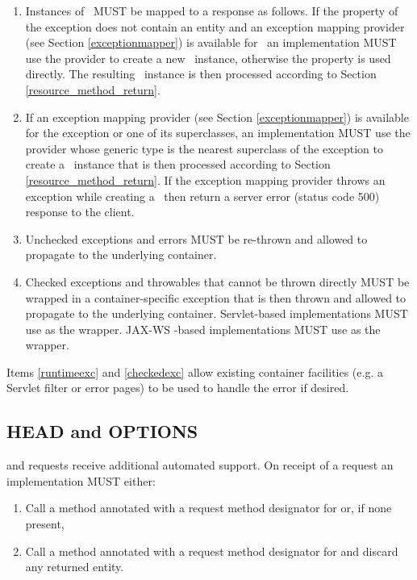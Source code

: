\begin{enumerate}
\item Instances of \WebAppExc\ MUST be mapped to a response as follows. If the  property of the exception does not contain an entity and an exception mapping provider (see Section \ref{exceptionmapper}) is available for \WebAppExc\, an implementation MUST use the provider to create a new \Response\ instance, otherwise the  property is used directly. The resulting \Response\ instance is then processed according to Section \ref{resource_method_return}.
\item If an exception mapping provider (see Section \ref{exceptionmapper}) is available for the exception or one of its superclasses, an implementation MUST use the provider whose generic type is the nearest superclass of the exception to create a \Response\ instance that is then processed according to Section \ref{resource_method_return}. If the exception mapping provider throws an exception while creating a \Response\ then return a server error (status code 500) response to the client.
\item\label{runtimeexc} Unchecked exceptions and errors MUST be re-thrown and allowed to propagate to the underlying container.
\item\label{checkedexc} Checked exceptions and throwables that cannot be thrown directly MUST be wrapped in a container-specific exception that is then thrown and allowed to propagate to the underlying container. Servlet-based implementations MUST use  as the wrapper. JAX-WS -based implementations MUST use  as the wrapper.
\end{enumerate}

\begin{nnnote}Items \ref{runtimeexc} and \ref{checkedexc} allow existing container facilities (e.g. a Servlet filter or error pages) to be used to handle the error if desired.\end{nnnote}

\subsection{HEAD and OPTIONS}
\label{head_and_options}

 and  requests receive additional automated support. On receipt of a  request an implementation MUST either:

\begin{enumerate}
\item Call a method annotated with a request method designator for  or, if none present,
\item\label{get_not_head} Call a method annotated with a request method designator for  and discard any returned entity.
\end{enumerate}

